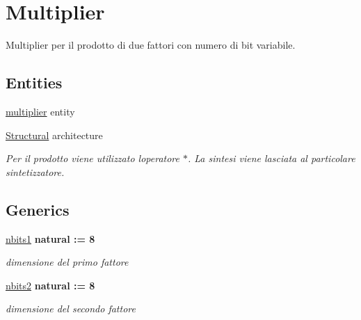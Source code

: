 \hypertarget{group___multiplier}{}\section{Multiplier}
\label{group___multiplier}


Multiplier per il prodotto di due fattori con numero di bit variabile.  


\subsection*{Entities}
\begin{DoxyCompactItemize}
\item 
\hyperlink{classmultiplier}{multiplier} entity
\item 
\hyperlink{classmultiplier_1_1_structural}{Structural} architecture
\begin{DoxyCompactList}\small\item\em Per il prodotto viene utilizzato l\textquotesingle{}operatore $\ast$. La sintesi viene lasciata al particolare sintetizzatore. \end{DoxyCompactList}\end{DoxyCompactItemize}
\subsection*{Generics}
 \begin{DoxyCompactItemize}
\item 
\hyperlink{group___multiplier_ga4ede473cdc13e75fe66fbd548b62e432}{nbits1} {\bfseries {\bfseries \textcolor{vhdlchar}{natural}\textcolor{vhdlchar}{ }\textcolor{vhdlchar}{ }\textcolor{vhdlchar}{\+:}\textcolor{vhdlchar}{=}\textcolor{vhdlchar}{ }\textcolor{vhdlchar}{ } \textcolor{vhdldigit}{8} \textcolor{vhdlchar}{ }}}
\begin{DoxyCompactList}\small\item\em dimensione del primo fattore \end{DoxyCompactList}\item 
\hyperlink{group___multiplier_ga8b5bdaff4c3669528aaec95a07e17c2a}{nbits2} {\bfseries {\bfseries \textcolor{vhdlchar}{natural}\textcolor{vhdlchar}{ }\textcolor{vhdlchar}{ }\textcolor{vhdlchar}{\+:}\textcolor{vhdlchar}{=}\textcolor{vhdlchar}{ }\textcolor{vhdlchar}{ } \textcolor{vhdldigit}{8} \textcolor{vhdlchar}{ }}}
\begin{DoxyCompactList}\small\item\em dimensione del secondo fattore \end{DoxyCompactList}\end{DoxyCompactItemize}
